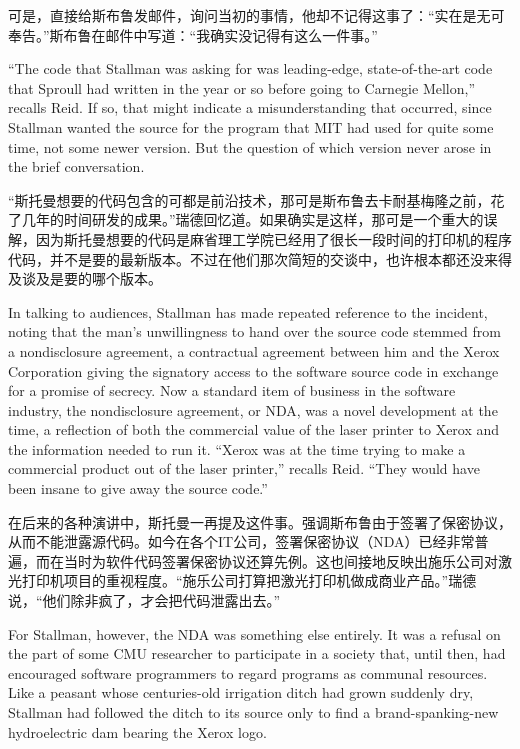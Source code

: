 \ifdefined\chs
可是，直接给斯布鲁发邮件，询问当初的事情，他却不记得这事了：“实在是无可奉告。”斯布鲁在邮件中写道：“我确实没记得有这么一件事。”
\fi

\ifdefined\eng
``The code that Stallman was asking for was leading-edge, state-of-the-art code that Sproull had written in the year or so before going to Carnegie Mellon,'' recalls Reid.  If so, that might indicate a misunderstanding that occurred, since Stallman wanted the source for the program that MIT had used for quite some time, not some newer version. But the question of which version never arose in the brief conversation.
\fi

\ifdefined\chs
“斯托曼想要的代码包含的可都是前沿技术，那可是斯布鲁去卡耐基梅隆之前，花了几年的时间研发的成果。”瑞德回忆道。如果确实是这样，那可是一个重大的误解，因为斯托曼想要的代码是麻省理工学院已经用了很长一段时间的打印机的程序代码，并不是要的最新版本。不过在他们那次简短的交谈中，也许根本都还没来得及谈及是要的哪个版本。
\fi

\ifdefined\eng
In talking to audiences, Stallman has made repeated reference to the incident, noting that the man's unwillingness to hand over the source code stemmed from a nondisclosure agreement, a contractual agreement between him and the Xerox Corporation giving the signatory access to the software source code in exchange for a promise of secrecy. Now a standard item of business in the software industry, the nondisclosure agreement, or NDA, was a novel development at the time, a reflection of both the commercial value of the laser printer to Xerox and the information needed to run it. ``Xerox was at the time trying to make a commercial product out of the laser printer,'' recalls Reid. ``They would have been insane to give away the source code.''
\fi

\ifdefined\chs
在后来的各种演讲中，斯托曼一再提及这件事。强调斯布鲁由于签署了保密协议，从而不能泄露源代码。如今在各个IT公司，签署保密协议（NDA）已经非常普遍，而在当时为软件代码签署保密协议还算先例。这也间接地反映出施乐公司对激光打印机项目的重视程度。“施乐公司打算把激光打印机做成商业产品。”瑞德说，“他们除非疯了，才会把代码泄露出去。”
\fi

\ifdefined\eng
For Stallman, however, the NDA was something else entirely. It was a refusal on the part of some CMU researcher to participate in a society that, until then, had encouraged software programmers to regard programs as communal resources. Like a peasant whose centuries-old irrigation ditch had grown suddenly dry, Stallman had followed the ditch to its source only to find a brand-spanking-new hydroelectric dam bearing the Xerox logo.
\fi

